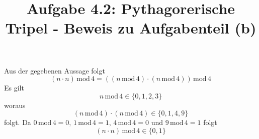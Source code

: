 \documentclass[ngerman,a4paper,bibliography=totocnumbered,fontsize=10.5pt]{scrartcl}
\title{Aufgabe 4.2: Pythagorerische Tripel - Beweis zu Aufgabenteil (b)}
\date{}
\begin{document}
\maketitle

Aus der gegebenen Aussage folgt
\begin{equation}
  (n\cdot n)\,\mathrm{mod}\,4=((n\,\mathrm{mod}\,4)\cdot(n\,\mathrm{mod}\,4))\,\mathrm{mod}\,4
\end{equation}
Es gilt
\begin{equation}
  n\, \mathrm{mod}\, 4 \in \{0,1,2,3\}
\end{equation}
woraus
\begin{equation}
  (n\,\mathrm{mod}\,4)\cdot(n\,\mathrm{mod}\,4) \in \{0,1,4,9\}
\end{equation}
folgt.
Da $0\,\mathrm{mod}\,4=0$, $1\,\mathrm{mod}\,4=1$, $4\,\mathrm{mod}\,4=0$ und $9\,\mathrm{mod}\,4=1$ folgt
\begin{equation}
  (n\cdot n)\,\mathrm{mod}\,4 \in \{0,1\}
\end{equation}
\end{document}
